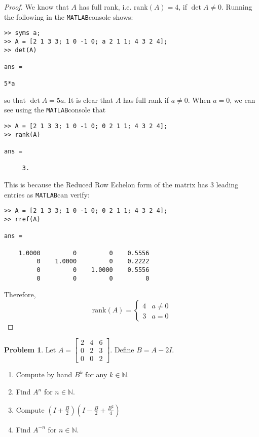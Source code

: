 \documentclass[12pt]{article}
\theoremstyle{definition}
\newtheorem{problem}{Problem}
\newcommand{\MAT}{\texttt{MATLAB}\hspace{1.25mm}}
\begin{document}
\begin{proof}
  We know that $A$ has full rank, i.e. $\text{rank}(A) = 4$, if
  $\det A \neq 0$. Running the following in the \MAT console shows:
  \begin{verbatim}
>> syms a;
>> A = [2 1 3 3; 1 0 -1 0; a 2 1 1; 4 3 2 4];
>> det(A)

ans =

5*a
  \end{verbatim}
  so that $\det A = 5a$. It is clear that $A$ has full rank if $a \neq 0$. When
  $a = 0$, we can see using the \MAT console that
  \begin{verbatim}
>> A = [2 1 3 3; 1 0 -1 0; 0 2 1 1; 4 3 2 4];
>> rank(A)

ans =

     3.
  \end{verbatim}
  This is because the Reduced Row Echelon form of the matrix has 3 leading entries as
  \MAT can verify:
  \begin{verbatim}
>> A = [2 1 3 3; 1 0 -1 0; 0 2 1 1; 4 3 2 4];
>> rref(A)

ans =

    1.0000         0         0    0.5556
         0    1.0000         0    0.2222
         0         0    1.0000    0.5556
         0         0         0         0
  \end{verbatim}
  Therefore,
  \[
    \text{rank}(A) =
    \begin{cases}
      4 & a \neq 0 \\
      3 & a = 0
    \end{cases}
  \]
\end{proof}


\begin{problem}
  Let $A = \begin{bmatrix} 2 & 4 & 6 \\ 0 & 2 & 3 \\ 0 & 0 & 2\end{bmatrix}$. Define $B = A - 2I$.
  \begin{enumerate}
    \item Compute by hand $B^k$ for any $k\in \mathbb{N}.$
    \item Find $A^n$ for $n \in \mathbb{N}.$
    \item Compute $\left(I + \frac{B}{2}\right) \left(I - \frac{B}{2} + \frac{B^2}{4}\right)$
    \item Find $A^{-n}$ for $n \in \mathbb{N}.$
  \end{enumerate}
\end{problem}
\end{document}
